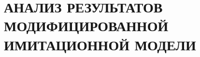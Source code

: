 \section[Анализ результатов модифицированной имитационной модели]{
  АНАЛИЗ РЕЗУЛЬТАТОВ \\
  МОДИФИЦИРОВАННОЙ \\
  ИМИТАЦИОННОЙ МОДЕЛИ}
